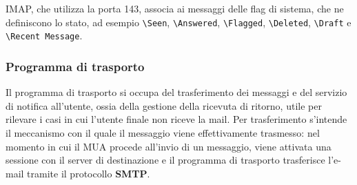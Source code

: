\documentclass[a4paper, twoside]{article}
\def\code#1{\texttt{#1}}
\def\subsub#1{\subsubsection{#1}\label{#1}}
\begin{document}
IMAP, che utilizza la porta 143, associa ai messaggi delle flag di sistema, che ne definiscono lo stato, ad esempio \code{\textbackslash Seen}, \code{\textbackslash Answered}, \code{\textbackslash Flagged}, \code{\textbackslash Deleted}, \code{\textbackslash Draft} e \code{\textbackslash Recent Message}.\\
\subsub{Programma di trasporto} Il programma di trasporto si occupa del trasferimento dei messaggi e del servizio di notifica all'utente, ossia della gestione della ricevuta di ritorno, utile per rilevare i casi in cui l'utente finale non riceve la mail.\newline
Per trasferimento s'intende il meccanismo con il quale il messaggio viene effettivamente trasmesso: nel momento in cui il MUA procede all'invio di un messaggio, viene attivata una sessione con il server di destinazione e il programma di trasporto trasferisce l'e-mail tramite il protocollo \textbf{SMTP}. 
\end{document}

